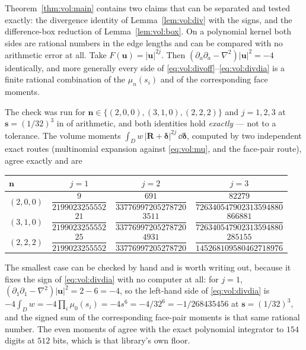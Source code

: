 Theorem~\ref{thm:vol:main} contains two claims that can be separated and tested exactly:
the divergence identity of Lemma~\ref{lem:vol:div} with the  signs, and the
difference-box reduction of Lemma~\ref{lem:vol:box}. On a polynomial kernel both sides are
rational numbers in the edge lengths and can be compared with no arithmetic error at all.
Take $F(\mathbf{u}) = |\mathbf{u}|^{2j}$. Then
$(\partial_a\partial_a - \nabla^2)|\mathbf{u}|^{2} = -4$ identically, and more generally
every side of \eqref{eq:vol:divoff}--\eqref{eq:vol:divdia} is a finite rational
combination of the $\mu_n(s_i)$ and of the corresponding face moments.

The check was run for $\mathbf{n} \in \{(2,0,0),(3,1,0),(2,2,2)\}$ and $j = 1,2,3$ at
$\mathbf{s} = (1/32)^3$ in  of  arithmetic, and both identities hold
\emph{exactly} --- not to a tolerance. The volume moments $\int_D w\,
|\mathbf{R}+\boldsymbol{\delta}|^{2j}\,\dd\boldsymbol{\delta}$, computed by two
independent exact routes (multinomial expansion against \eqref{eq:vol:mu}, and the
face-pair route), agree exactly and are

\begin{center}\small
\begin{tabular}{@{}lccc@{}}
\toprule
$\mathbf{n}$ & $j = 1$ & $j = 2$ & $j = 3$\\
\midrule
$(2,0,0)$ & $\dfrac{9}{2199023255552}$ & $\dfrac{691}{33776997205278720}$
          & $\dfrac{82279}{726340547902313594880}$\\[6pt]
$(3,1,0)$ & $\dfrac{21}{2199023255552}$ & $\dfrac{3511}{33776997205278720}$
          & $\dfrac{866881}{726340547902313594880}$\\[6pt]
$(2,2,2)$ & $\dfrac{25}{2199023255552}$ & $\dfrac{4931}{33776997205278720}$
          & $\dfrac{285155}{145268109580462718976}$\\
\bottomrule
\end{tabular}
\end{center}

\noindent
The smallest case can be checked by hand and is worth writing out, because it fixes the
sign of \eqref{eq:vol:divdia} with no computer at all: for $j = 1$,
$(\partial_1\partial_1 - \nabla^2)|\mathbf{u}|^2 = 2 - 6 = -4$, so the left-hand side of
\eqref{eq:vol:divdia} is $-4\int_D w = -4\prod_i \mu_0(s_i) = -4 s^6 = -4/32^6 =
-1/268435456$ at $\mathbf{s} = (1/32)^3$, and the signed sum of the corresponding
face-pair moments is that same rational number. The even moments of
 agree with the exact polynomial integrator to $154$
digits at $512$ bits, which is that library's own floor.

